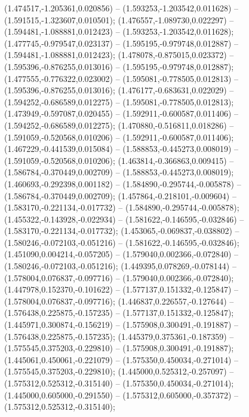  (1.474517,-1.205361,0.020856) -- (1.593253,-1.203542,0.011628) -- (1.591515,-1.323607,0.010501);
 (1.476557,-1.089730,0.022297) -- (1.594481,-1.088881,0.012423) -- (1.593253,-1.203542,0.011628);
 (1.477745,-0.979547,0.023137) -- (1.595195,-0.979748,0.012887) -- (1.594481,-1.088881,0.012423);
 (1.478078,-0.875015,0.023372) -- (1.595396,-0.876255,0.013016) -- (1.595195,-0.979748,0.012887);
 (1.477555,-0.776322,0.023002) -- (1.595081,-0.778505,0.012813) -- (1.595396,-0.876255,0.013016);
 (1.476177,-0.683631,0.022029) -- (1.594252,-0.686589,0.012275) -- (1.595081,-0.778505,0.012813);
 (1.473949,-0.597087,0.020455) -- (1.592911,-0.600587,0.011406) -- (1.594252,-0.686589,0.012275);
 (1.470880,-0.516811,0.018286) -- (1.591059,-0.520568,0.010206) -- (1.592911,-0.600587,0.011406);
 (1.467229,-0.441539,0.015084) -- (1.588853,-0.445273,0.008019) -- (1.591059,-0.520568,0.010206);
 (1.463814,-0.366863,0.009415) -- (1.586784,-0.370449,0.002709) -- (1.588853,-0.445273,0.008019);
 (1.460693,-0.292398,0.001182) -- (1.584890,-0.295744,-0.005878) -- (1.586784,-0.370449,0.002709);
 (1.457864,-0.218101,-0.009604) -- (1.583170,-0.221134,-0.017732) -- (1.584890,-0.295744,-0.005878);
 (1.455322,-0.143928,-0.022934) -- (1.581622,-0.146595,-0.032846) -- (1.583170,-0.221134,-0.017732);
 (1.453065,-0.069837,-0.038802) -- (1.580246,-0.072103,-0.051216) -- (1.581622,-0.146595,-0.032846);
 (1.451090,0.004214,-0.057205) -- (1.579040,0.002366,-0.072840) -- (1.580246,-0.072103,-0.051216);
 (1.449395,0.078269,-0.078144) -- (1.578004,0.076837,-0.097716) -- (1.579040,0.002366,-0.072840);
 (1.447978,0.152370,-0.101622) -- (1.577137,0.151332,-0.125847) -- (1.578004,0.076837,-0.097716);
 (1.446837,0.226557,-0.127644) -- (1.576438,0.225875,-0.157235) -- (1.577137,0.151332,-0.125847);
 (1.445971,0.300874,-0.156219) -- (1.575908,0.300491,-0.191887) -- (1.576438,0.225875,-0.157235);
 (1.445379,0.375361,-0.187359) -- (1.575545,0.375203,-0.229810) -- (1.575908,0.300491,-0.191887);
 (1.445061,0.450061,-0.221079) -- (1.575350,0.450034,-0.271014) -- (1.575545,0.375203,-0.229810);
 (1.445000,0.525312,-0.257097) -- (1.575312,0.525312,-0.315140) -- (1.575350,0.450034,-0.271014);
 (1.445000,0.605000,-0.291550) -- (1.575312,0.605000,-0.357372) -- (1.575312,0.525312,-0.315140);
